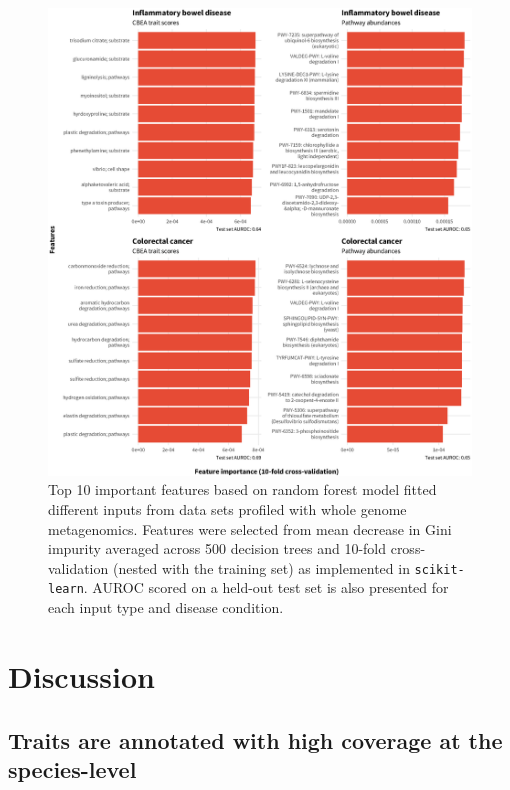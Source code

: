 \begin{figure}[!h]
\includegraphics[width=0.99\linewidth]{figures/ch4_f4.eps}
\caption[Top 10 important features based on random forest model fitted different inputs from data sets profiled with whole genome metagenomics]{Top 10 important features based on random forest model fitted different inputs from data sets profiled with whole genome metagenomics. Features were selected from mean decrease in Gini impurity averaged across 500 decision trees and 10-fold cross-validation (nested with the training set) as implemented in \texttt{scikit-learn}. AUROC scored on a held-out test set is also presented for each input type and disease condition.}
\label{fig:4.4}
\end{figure}

\section{Discussion}
\subsection{Traits are annotated with high coverage at the species-level}

